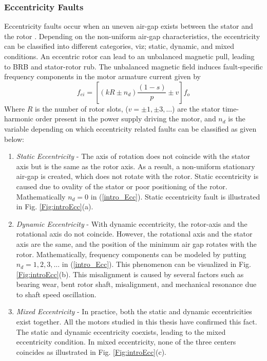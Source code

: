 \subsubsection{Eccentricity Faults}
Eccentricity faults occur when an uneven air-gap exists between the stator and the rotor \cite{Nandi2005}. Depending on the non-uniform air-gap characteristics, the eccentricity can be classified into different categories, viz; static, dynamic, and mixed conditions.  An eccentric rotor can lead to an unbalanced magnetic pull, leading to BRB and stator-rotor rub. The unbalanced magnetic field induces fault-specific frequency components in the motor armature current given by \cite{Nandi2005,Gyftakis2013}
\begin{equation}
	\label{intro_Ecc}
	{f_{ei}} = \left[ {\left( {kR \pm {n_d}} \right)\frac{{\left( {1 - s} \right)}}{p} \pm v} \right]{f_o}
\end{equation}
Where $R$ is the number of rotor slots, ($v = \pm 1, \pm 3, ...$) are the stator time-harmonic order present in the power supply driving the motor, and $n_d$ is the variable depending on which eccentricity related faults can be classified as given below:
\begin{enumerate}
	\renewcommand{\theenumi}{\roman{enumi}}
	\item \emph{Static Eccentricity} - The axis of rotation does not coincide with the stator axis but is the same as the rotor axis. As a result, a non-uniform stationary air-gap is created, which does not rotate with the rotor. Static eccentricity is caused due to ovality of the stator or poor positioning of the rotor. Mathematically $n_d = 0$ in (\ref{intro_Ecc}). Static eccentricity fault is illustrated in Fig. \ref{Fig:introEcc}(a). 
	\item \emph{Dynamic Eccentricity} - With dynamic eccentricity, the  rotor-axis and the rotational axis do not coincide. However, the rotational axis and the stator axis are the same, and the position of the minimum air gap rotates with the rotor. Mathematically, frequency components can be modeled by putting $n_d = 1,2,3,...$ in (\ref{intro_Ecc}). This phenomenon can be visualized in Fig. \ref{Fig:introEcc}(b). This misalignment is caused by several factors such as bearing wear, bent rotor shaft, misalignment, and mechanical resonance due to shaft speed oscillation.
	\item \emph{Mixed Eccentricity} - In practice, both the static and dynamic eccentricities exist together. All the motors studied in this thesis have confirmed this fact. The static and dynamic eccentricity coexists, leading to the mixed eccentricity condition. In mixed eccentricity, none of the three centers coincides as illustrated in Fig. \ref{Fig:introEcc}(c).
\end{enumerate}
